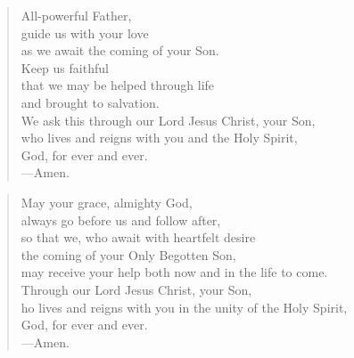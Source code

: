 \prayer

\setlength{\vleftmargin}{\prayerleftmargini}

\begin{verse}
All-powerful Father,\\
guide us with your love\\
as we await the coming of your Son.\\
Keep us faithful\\
that we may be helped through life\\
and brought to salvation.\\
We ask this through our Lord Jesus Christ, your Son,\\
who lives and reigns with you and the Holy Spirit,\\
God, for ever and ever.\\
{\color{red}---\thinspace}Amen.
\end{verse}


\begin{verse}
May your grace, almighty God,\\
 always go before us and follow after,\\
so that we, who await with heartfelt desire\\
the coming of your Only Begotten Son,\\
may receive your help both now and in the life to come.\\
Through our Lord Jesus Christ, your Son,\\
ho lives and reigns with you in the unity of the Holy Spirit,\\
God, for ever and ever.\\
{\color{red}---\thinspace}Amen.
\end{verse}

\setlength{\vleftmargin}{\defleftmargini}